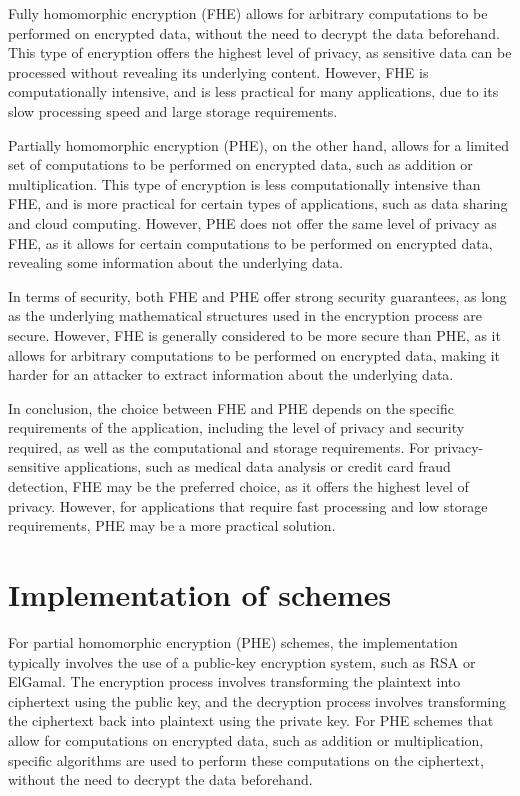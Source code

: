 \documentclass[a4paper,11pt]{report}
\begin{document}
Fully homomorphic encryption (FHE) allows for arbitrary computations to be performed on encrypted data, without the need to decrypt the data beforehand. This type of encryption offers the highest level of privacy, as sensitive data can be processed without revealing its underlying content. However, FHE is computationally intensive, and is less practical for many applications, due to its slow processing speed and large storage requirements.

Partially homomorphic encryption (PHE), on the other hand, allows for a limited set of computations to be performed on encrypted data, such as addition or multiplication. This type of encryption is less computationally intensive than FHE, and is more practical for certain types of applications, such as data sharing and cloud computing. However, PHE does not offer the same level of privacy as FHE, as it allows for certain computations to be performed on encrypted data, revealing some information about the underlying data.

In terms of security, both FHE and PHE offer strong security guarantees, as long as the underlying mathematical structures used in the encryption process are secure. However, FHE is generally considered to be more secure than PHE, as it allows for arbitrary computations to be performed on encrypted data, making it harder for an attacker to extract information about the underlying data.

In conclusion, the choice between FHE and PHE depends on the specific requirements of the application, including the level of privacy and security required, as well as the computational and storage requirements. For privacy-sensitive applications, such as medical data analysis or credit card fraud detection, FHE may be the preferred choice, as it offers the highest level of privacy. However, for applications that require fast processing and low storage requirements, PHE may be a more practical solution.
\section{Implementation of schemes}
For partial homomorphic encryption (PHE) schemes, the implementation typically involves the use of a public-key encryption system, such as RSA or ElGamal. The encryption process involves transforming the plaintext into ciphertext using the public key, and the decryption process involves transforming the ciphertext back into plaintext using the private key. For PHE schemes that allow for computations on encrypted data, such as addition or multiplication, specific algorithms are used to perform these computations on the ciphertext, without the need to decrypt the data beforehand.
\end{document}
